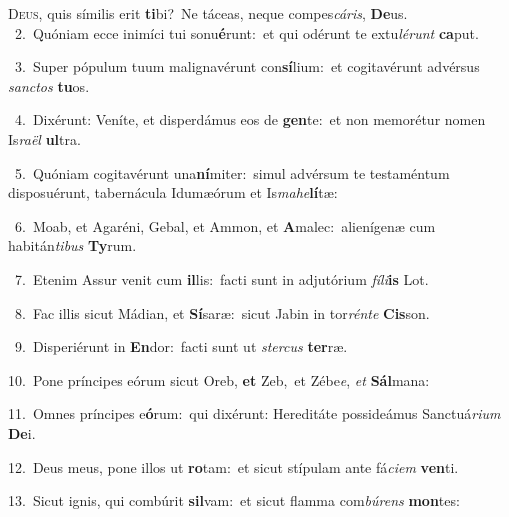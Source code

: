 \lettrine{\initial\textcolor{\initialcolor}{D}}{eus,} quis símilis erit \textbf{ti}\-bi?~\star Ne táceas, neque compes\-\textit{cá}\-\textit{ris}, \textbf{De}\-us.\\
{\numbfont\textcolor{\numbcolor}{~2.}}~Quóniam ecce inimíci tui sonu\-\textbf{é}\-runt:~\star et qui odérunt te extu\-\textit{lé}\-\textit{runt} \textbf{ca}\-put.\par
{\numbfont\textcolor{\numbcolor}{~3.}}~Super pópulum tuum malignavérunt con\-\textbf{sí}\-lium:~\star et cogitavérunt advérsus \textit{sanc}\-\textit{tos} \textbf{tu}\-os.\par
{\numbfont\textcolor{\numbcolor}{~4.}}~Dixérunt: Veníte, et disperdámus eos de \textbf{gen}\-te:~\star et non memorétur nomen Is\-\textit{ra}\-\textit{ël} \textbf{ul}\-tra.\par
{\numbfont\textcolor{\numbcolor}{~5.}}~Quóniam cogitavérunt una\-\textbf{ní}\-miter:~\star simul advérsum te testaméntum disposuérunt, tabernácula Idumæórum et Is\-\textit{ma}\-\textit{he}\textbf{lí}tæ:\par
{\numbfont\textcolor{\numbcolor}{~6.}}~Moab, et Agaréni, Gebal, et Ammon, et \textbf{A}\-malec:~\star alienígenæ cum habitán\-\textit{ti}\-\textit{bus} \textbf{Ty}\-rum.\par
{\numbfont\textcolor{\numbcolor}{~7.}}~Etenim Assur venit cum \textbf{il}\-lis:~\star facti sunt in adjutórium \textit{fí}\-\textit{li}\textbf{is} Lot.\par
{\numbfont\textcolor{\numbcolor}{~8.}}~Fac illis sicut Mádian, et \textbf{Sí}\-saræ:~\star sicut Jabin in tor\-\textit{rén}\-\textit{te} \textbf{Cis}\-son.\par
{\numbfont\textcolor{\numbcolor}{~9.}}~Disperiérunt in \textbf{En}\-dor:~\star facti sunt ut \textit{ster}\-\textit{cus} \textbf{ter}\-ræ.\par
{\numbfont\textcolor{\numbcolor}{10.}}~Pone príncipes eórum sicut Oreb, \textbf{et} Zeb,~\star et Zébe\-\textit{e}\-, \textit{et} \textbf{Sál}\-mana:\par
{\numbfont\textcolor{\numbcolor}{11.}}~Omnes príncipes e\-\textbf{ó}\-rum:~\star qui dixérunt: Hereditáte possideámus Sanctuá\-\textit{ri}\-\textit{um} \textbf{De}\-i.\par
{\numbfont\textcolor{\numbcolor}{12.}}~Deus meus, pone illos ut \textbf{ro}\-tam:~\star et sicut stípulam ante fá\-\textit{ci}\-\textit{em} \textbf{ven}\-ti.\par
{\numbfont\textcolor{\numbcolor}{13.}}~Sicut ignis, qui combúrit \textbf{sil}\-vam:~\star et sicut flamma com\-\textit{bú}\-\textit{rens} \textbf{mon}\-tes:\par
